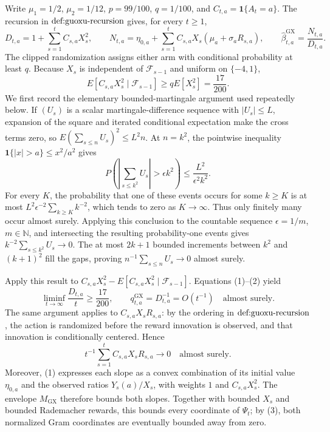 Write \(\mu _1=1/2\), \(\mu _2=1/12\), \(p=99/100\), \(q=1/100\), and \(C_{t,a}=\mathbf 1\{A_t=a\}\). The recursion in \(\textnormal{def:guoxu-recursion}\) gives, for every \(t\geq 1\),
\[
 D_{t,a}=1+\sum_{s=1}^t C_{s,a}X_s^2,\qquad
 N_{t,a}=\eta_{0,a}+\sum_{s=1}^t C_{s,a}X_s(\mu_a+\sigma_aR_{s,a}),\qquad
 \widehat\beta^{\mathrm{GX}}_{t,a}=\frac{N_{t,a}}{D_{t,a}}. \tag{1}
\]
The clipped randomization assigns either arm with conditional probability at least \(q\). Because \(X_s\) is independent of \(\mathcal F_{s-1}\) and uniform on \(\{-4,1\}\),
\[
 E[C_{s,a}X_s^2\mid\mathcal F_{s-1}]
 \geq qE[X_s^2]=\frac{17}{200}. \tag{2}
\]
We first record the elementary bounded-martingale argument used repeatedly below. If \((U_s)\) is a scalar martingale-difference sequence with \(|U_s|\leq L\), expansion of the square and iterated conditional expectation make the cross terms zero, so \(E(\sum_{s\leq n}U_s)^2\leq L^2n\). At \(n=k^2\), the pointwise inequality \(\mathbf 1\{|x|>a\}\leq x^2/a^2\) gives
\[
 P\left(\left|\sum_{s\leq k^2}U_s\right|>\epsilon k^2\right)
 \leq \frac{L^2}{\epsilon^2k^2}.
\]
For every \(K\), the probability that one of these events occurs for some \(k\geq K\) is at most \(L^2\epsilon^{-2}\sum_{k\geq K}k^{-2}\), which tends to zero as \(K\to\infty\). Thus only finitely many occur almost surely. Applying this conclusion to the countable sequence \(\epsilon=1/m\), \(m\in\mathbb N\), and intersecting the resulting probability-one events gives \(k^{-2}\sum_{s\leq k^2}U_s\to0\). The at most \(2k+1\) bounded increments between \(k^2\) and \((k+1)^2\) fill the gaps, proving \(n^{-1}\sum_{s\leq n}U_s\to0\) almost surely.

Apply this result to \(C_{s,a}X_s^2-E[C_{s,a}X_s^2\mid\mathcal F_{s-1}]\). Equations (1)--(2) yield
\[
 \liminf_{t\to\infty}\frac{D_{t,a}}t\geq\frac{17}{200},
 \qquad q^{\mathrm{GX}}_{t,a}=D_{t,a}^{-1}=O(t^{-1})
 \quad\text{almost surely}. \tag{3}
\]
The same argument applies to \(C_{s,a}X_sR_{s,a}\): by the ordering in \(\textnormal{def:guoxu-recursion}\), the action is randomized before the reward innovation is observed, and that innovation is conditionally centered. Hence
\[
 t^{-1}\sum_{s=1}^tC_{s,a}X_sR_{s,a}\longrightarrow0
 \quad\text{almost surely}. \tag{4}
\]
Moreover, (1) expresses each slope as a convex combination of its initial value \(\eta_{0,a}\) and the observed ratios \(Y_s(a)/X_s\), with weights \(1\) and \(C_{s,a}X_s^2\). The envelope \(M_{\mathrm{GX}}\) therefore bounds both slopes. Together with bounded \(X_s\) and bounded Rademacher rewards, this bounds every coordinate of \(\Psi_t\); by (3), both normalized Gram coordinates are eventually bounded away from zero.

